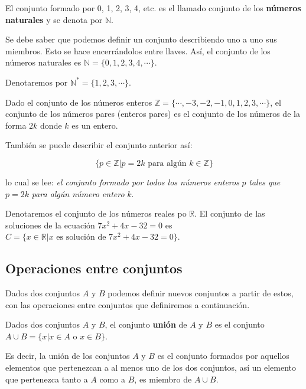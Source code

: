 \documentclass[12pt,]{krantz}
\theoremstyle{definition}
\theoremstyle{definition}
\theoremstyle{definition}
\theoremstyle{remark}
\let\BeginKnitrBlock\begin \let\EndKnitrBlock\end
\begin{document}
\BeginKnitrBlock{example}
\protect\hypertarget{exm:unnamed-chunk-8}{}{\label{exm:unnamed-chunk-8} }El
conjunto formado por 0, 1, 2, 3, 4, etc. es el llamado conjunto de los
\textbf{números naturales} y se denota por \(\mathbb{N}\).

Se debe saber que podemos definir un conjunto describiendo uno a uno sus
miembros. Esto se hace encerrándolos entre llaves. Así, el conjunto de
los números naturales es \(\mathbb{N}=\{0, 1, 2, 3, 4,\cdots\}\).

Denotaremos por \(\mathbb{N}^{*}=\{ 1, 2, 3, \cdots \}\).
\EndKnitrBlock{example}

\BeginKnitrBlock{example}
\protect\hypertarget{exm:unnamed-chunk-9}{}{\label{exm:unnamed-chunk-9}
}Dado el conjunto de los números enteros
\(\mathbb{Z}=\{\cdots,-3,-2,-1,0,1,2,3,\cdots \}\), el conjunto de los
números pares (enteros pares) es el conjunto de los números de la forma
\(2k\) donde \(k\) es un entero.

También se puede describir el conjunto anterior así:

\[\{p\in\mathbb{Z}| p=2k \mbox{ para algún } k\in\mathbb{Z} \}\]

lo cual se lee: \emph{el conjunto formado por todos los números enteros}
\(p\) \emph{tales que} \(p=2k\) \emph{para algún número entero} \(k\).
\EndKnitrBlock{example}

\BeginKnitrBlock{example}
\protect\hypertarget{exm:unnamed-chunk-10}{}{\label{exm:unnamed-chunk-10}
}Denotaremos el conjunto de los números reales po \(\mathbb{R}\). El
conjunto de las soluciones de la ecuación \(7x^{2}+4x-32=0\) es
\(C=\{x\in\mathbb{R}| x \mbox{ es solución de } 7x^{2}+4x-32=0 \}\).
\EndKnitrBlock{example}

\subsection{Operaciones entre
conjuntos}\label{operaciones-entre-conjuntos}

Dados dos conjuntos \(A\) y \(B\) podemos definir nuevos conjuntos a
partir de estos, con las operaciones entre conjuntos que definiremos a
continuación.

\BeginKnitrBlock{definition}
\protect\hypertarget{def:uniondeconjuntos}{}{\label{def:uniondeconjuntos}
}Dados dos conjuntos \(A\) y \(B\), el conjunto \textbf{unión} de \(A\)
y \(B\) es el conjunto \(A\cup B = \{ x| x\in A \mbox{ o } x\in B \}\).
\EndKnitrBlock{definition}

Es decir, la unión de los conjuntos \(A\) y \(B\) es el conjunto
formados por aquellos elementos que pertenezcan a al menos uno de los
dos conjuntos, así un elemento que pertenezca tanto a \(A\) como a
\(B\), es miembro de \(A\cup B\).
\end{document}
